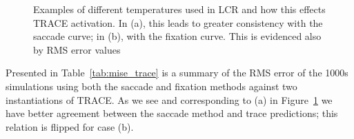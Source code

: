 \documentclass{article}
\begin{document}
\begin{figure}[H]
    \centering

    \caption{Examples of different temperatures used in LCR and how this effects TRACE activation. In (a), this leads to greater consistency with the saccade curve; in (b), with the fixation curve. This is evidenced also by RMS error values}
\label{fig:shades_of_trace2}
\end{figure}


Presented in Table~\ref{tab:mise_trace} is a summary of the RMS error of the 1000s simulations using both the saccade and fixation methods against two instantiations of TRACE. As we see and corresponding to (a) in Figure~\ref{fig:shades_of_trace2} we have better agreement between the saccade method and trace predictions; this relation is flipped for case (b). 
\end{document}
